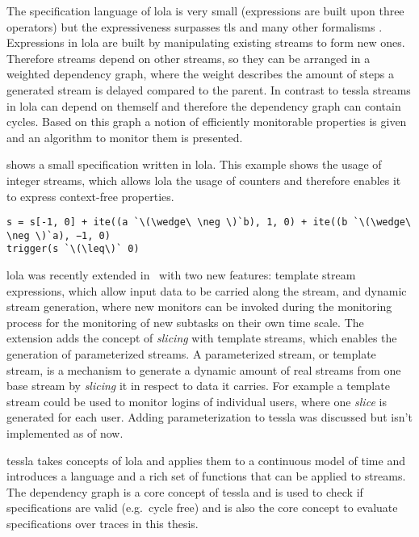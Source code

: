 The specification language of \gls{lola} is very small (expressions are built upon three operators) but the expressiveness surpasses \glspl{tl} and many other formalisms \citep{DAngelo2005}.
Expressions in \gls{lola} are built by manipulating existing streams to form new ones.
Therefore streams depend on other streams, so they can be arranged in a weighted dependency graph, where the weight describes the amount of steps a generated stream is delayed compared to the parent.
In contrast to \gls{tessla} streams in \gls{lola} can depend on themself and therefore the dependency graph can contain cycles.
Based on this graph a notion of efficiently monitorable properties is given and an algorithm to monitor them is presented.

 shows a small specification written in \gls{lola}.
This example shows the usage of integer streams, which allows \gls{lola} the usage of counters and therefore enables it to express context-free properties.

\begin{lstlisting}[escapeinside=``,numbers=none,float,label=listing:lola_spec, caption={[A specification written in \gls{lola}]A \gls{lola} specification describing the property that the number of \emph{a}\'s in a stream shall never be less then the number of \emph{b}\'s}]
s = s[-1, 0] + ite((a `\(\wedge\ \neg \)`b), 1, 0) + ite((b `\(\wedge\ \neg \)`a), −1, 0)
trigger(s `\(\leq\)` 0)
\end{lstlisting}

\Gls{lola} was recently extended in~\cite{Faymonville2016} with two new features:  template stream expressions, which allow input data to be carried along the stream, and dynamic stream generation, where new monitors can be invoked during the monitoring process for the monitoring of new subtasks on their own time scale.
The extension adds the concept of \emph{slicing} with template streams, which enables the generation of  parameterized streams.
A parameterized stream, or template stream, is a mechanism to generate a dynamic amount of real streams from one base stream by \emph{slicing} it in respect to data it carries.
For example a template stream could be used to monitor logins of individual users, where one \emph{slice} is generated for each user.
Adding parameterization to \gls{tessla} was discussed but isn't implemented as of now.

\gls{tessla} takes concepts of \gls{lola} and applies them to a continuous model of time and introduces a language and a rich set of functions that can be applied to streams.
The dependency graph is a core concept of \gls{tessla} and is used to check if specifications are valid (e.g.\ cycle free) and is also the core concept to evaluate specifications over traces in this thesis.

